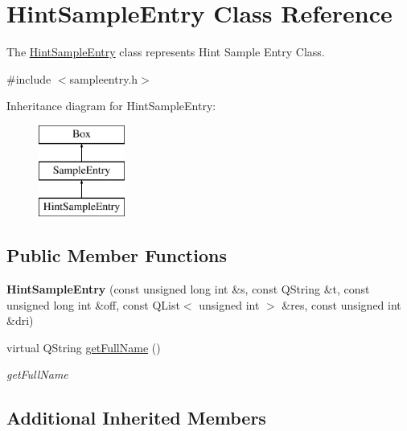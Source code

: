 \hypertarget{class_hint_sample_entry}{\section{Hint\-Sample\-Entry Class Reference}
\label{class_hint_sample_entry}
}


The \hyperlink{class_hint_sample_entry}{Hint\-Sample\-Entry} class represents Hint Sample Entry Class.  




{\ttfamily \#include $<$sampleentry.\-h$>$}

Inheritance diagram for Hint\-Sample\-Entry\-:\begin{figure}[H]
\begin{center}
\leavevmode
\includegraphics[height=3.000000cm]{class_hint_sample_entry}
\end{center}
\end{figure}
\subsection*{Public Member Functions}
\begin{DoxyCompactItemize}
\item 
\hypertarget{class_hint_sample_entry_ad981306f2f9352416a0657cc2eaa8668}{{\bfseries Hint\-Sample\-Entry} (const unsigned long int \&s, const Q\-String \&t, const unsigned long int \&off, const Q\-List$<$ unsigned int $>$ \&res, const unsigned int \&dri)}\label{class_hint_sample_entry_ad981306f2f9352416a0657cc2eaa8668}

\item 
virtual Q\-String \hyperlink{class_hint_sample_entry_ac747c305de54a619efe66d5d8e0ec61a}{get\-Full\-Name} ()
\begin{DoxyCompactList}\small\item\em get\-Full\-Name \end{DoxyCompactList}\end{DoxyCompactItemize}
\subsection*{Additional Inherited Members}


